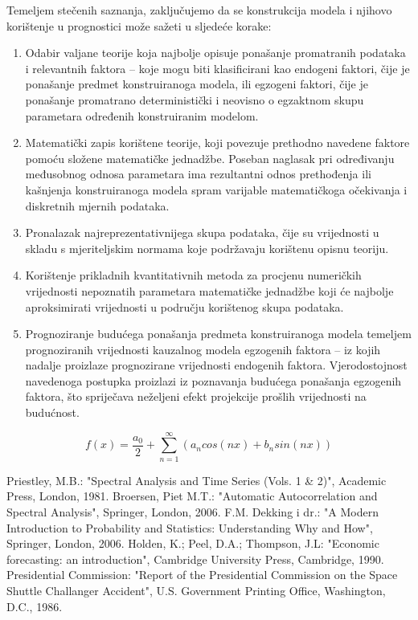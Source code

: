 \documentclass[a4paper,12pt,oneside]{memoir}
\newcommand{\fourierovred}{f(x)= \frac{a_0}{2}+\sum_{n=1}^\infty (a_n cos(nx)+b_n sin(nx))}
\begin{document}
        Temeljem stečenih saznanja, zaključujemo da se konstrukcija modela i njihovo korištenje u prognostici može sažeti u sljedeće korake:
        \begin{enumerate}
            \item Odabir valjane teorije koja najbolje opisuje ponašanje promatranih podataka i relevantnih faktora -- koje mogu biti klasificirani kao endogeni faktori, čije je ponašanje predmet konstruiranoga modela, ili egzogeni faktori, čije je ponašanje promatrano deterministički i neovisno o egzaktnom skupu parametara određenih konstruiranim modelom.
            \item Matematički zapis korištene teorije, koji povezuje prethodno navedene faktore pomoću složene matematičke jednadžbe. Poseban naglasak pri određivanju međusobnog odnosa parametara ima rezultantni odnos prethođenja ili kašnjenja konstruiranoga modela spram varijable matematičkoga očekivanja i diskretnih mjernih podataka.
            \item Pronalazak najreprezentativnijega skupa podataka, čije su vrijednosti u skladu s mjeriteljskim normama koje podržavaju korištenu opisnu teoriju.
            \item Korištenje prikladnih kvantitativnih metoda za procjenu numeričkih vrijednosti nepoznatih parametara matematičke jednadžbe koji će najbolje aproksimirati vrijednosti u području korištenog skupa podataka.
            \item Prognoziranje budućega ponašanja predmeta konstruiranoga modela temeljem prognoziranih vrijednosti kauzalnog modela egzogenih faktora -- iz kojih nadalje proizlaze prognozirane vrijednosti endogenih faktora. Vjerodostojnost navedenoga postupka proizlazi iz poznavanja budućega ponašanja egzogenih faktora, što spriječava neželjeni efekt projekcije prošlih vrijednosti na budućnost.
        \end{enumerate}
        $$\fourierovred$$
    \begin{thebibliography}{9}
         Priestley, M.B.: "Spectral Analysis and Time Series (Vols. 1 \& 2)", Academic Press, London, 1981.
         Broersen, Piet M.T.: "Automatic Autocorrelation and Spectral Analysis", Springer, London, 2006.
         F.M. Dekking i dr.: "A Modern Introduction to Probability and Statistics: Understanding Why and How", Springer, London, 2006.
         Holden, K.; Peel, D.A.; Thompson, J.L: "Economic forecasting: an introduction", Cambridge University Press, Cambridge, 1990.
         Presidential Commission: "Report of the Presidential Commission on the Space Shuttle Challanger Accident", U.S. Government Printing Office, Washington, D.C., 1986.

    \end{thebibliography}
\end{document}

